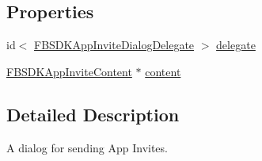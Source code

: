 \subsection*{Properties}
\begin{DoxyCompactItemize}
\item 
id$<$ \hyperlink{protocol_f_b_s_d_k_app_invite_dialog_delegate-p}{F\-B\-S\-D\-K\-App\-Invite\-Dialog\-Delegate} $>$ \hyperlink{interface_f_b_s_d_k_app_invite_dialog_afd09a07b729c7263d4c3d9e5b0b62ada}{delegate}
\item 
\hyperlink{interface_f_b_s_d_k_app_invite_content}{F\-B\-S\-D\-K\-App\-Invite\-Content} $\ast$ \hyperlink{interface_f_b_s_d_k_app_invite_dialog_a18b98a61c112122c1baf3a36047c9cda}{content}
\end{DoxyCompactItemize}


\subsection{Detailed Description}
A dialog for sending App Invites. 

